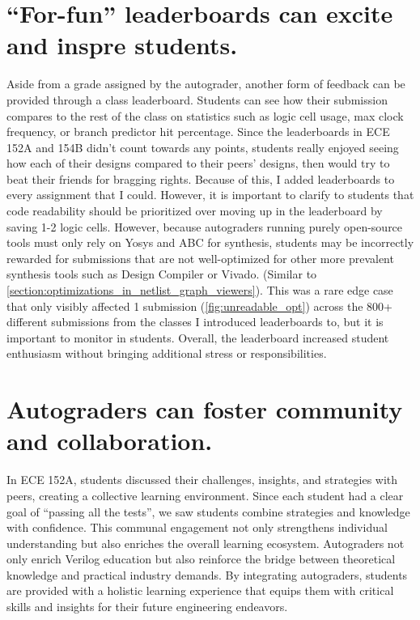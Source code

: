 \section{``For-fun'' leaderboards can excite and inspre students.}
\label{section:leaderboard}



Aside from a grade assigned by the autograder, another form of feedback can be provided through a class leaderboard. Students can see how their submission compares to the rest of the class on statistics such as logic cell usage, max clock frequency, or branch predictor hit percentage. Since the leaderboards in ECE 152A and 154B didn't count towards any points, students really enjoyed seeing how each of their designs compared to their peers' designs, then would try to beat their friends for bragging rights. Because of this, I added leaderboards to every assignment that I could. However, it is important to clarify to students that code readability should be prioritized over moving up in the leaderboard by saving 1-2 logic cells. However, because autograders running purely open-source tools must only rely on Yosys and ABC for synthesis, students may be incorrectly rewarded for submissions that are not well-optimized for other more prevalent synthesis tools such as Design Compiler or Vivado. (Similar to \autoref{section:optimizations_in_netlist_graph_viewers}). This was a rare edge case that only visibly affected 1 submission (\autoref{fig:unreadable_opt}) across the 800+ different submissions from the classes I introduced leaderboards to, but it is important to monitor in students. Overall, the leaderboard increased student enthusiasm without bringing additional stress or responsibilities.

\section{Autograders can foster community and collaboration.}

In ECE 152A, students discussed their challenges, insights, and strategies with peers, creating a collective learning environment. Since each student had a clear goal of ``passing all the tests'', we saw students combine strategies and knowledge with confidence. This communal engagement not only strengthens individual understanding but also enriches the overall learning ecosystem. Autograders not only enrich Verilog education but also reinforce the bridge between theoretical knowledge and practical industry demands. By integrating autograders, students are provided with a holistic learning experience that equips them with critical skills and insights for their future engineering endeavors.
